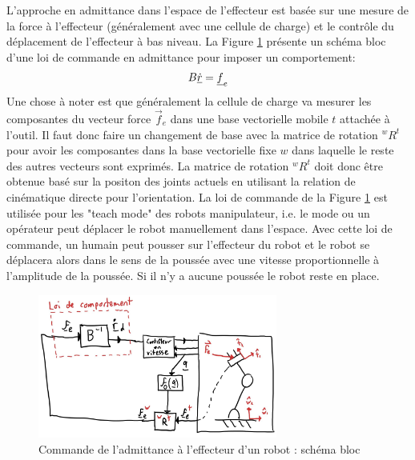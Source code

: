 L'approche en admittance dans l'espace de l'effecteur est basée sur une mesure de la force à l'effecteur (généralement avec une cellule de charge) et le contrôle du déplacement de l'effecteur à bas niveau. La Figure \ref{fig:admittancecontroltaskspace1} présente un schéma bloc d'une loi de commande en admittance pour imposer un comportement: %
\begin{align}
B \underline{\dot{r}} = \underline{f}_e
\end{align}
Une chose à noter est que généralement la cellule de charge va mesurer les composantes du vecteur force $\Vec{f}_e$ dans une base vectorielle mobile $t$ attachée à l'outil. Il faut donc faire un changement de base avec la matrice de rotation ${}^{w}R^t$ pour avoir les composantes dans la base vectorielle fixe $w$ dans laquelle le reste des autres vecteurs sont exprimés. La matrice de rotation ${}^{w}R^t$ doit donc être obtenue basé sur la positon des joints actuels en utilisant la relation de cinématique directe pour l'orientation. La loi de commande de la Figure \ref{fig:admittancecontroltaskspace1} est utilisée pour les "teach mode" des robots manipulateur, i.e. le mode ou un opérateur peut déplacer le robot manuellement dans l'espace. Avec cette loi de commande, un humain peut pousser sur l'effecteur du robot et le robot se déplacera alors dans le sens de la poussée avec une vitesse proportionnelle à l'amplitude de la poussée. Si il n'y a aucune poussée le robot reste en place. 
\begin{figure}[h]
	\centering
		\includegraphics[width=0.70\textwidth]{fig/admittancecontroltaskspace1.jpg}
	\caption{Commande de l'admittance à l'effecteur d'un robot : schéma bloc}
	\label{fig:admittancecontroltaskspace1}
\end{figure}

